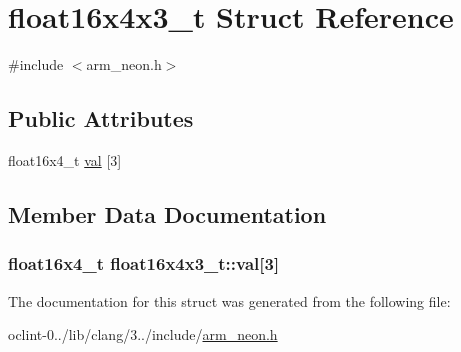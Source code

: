 \hypertarget{structfloat16x4x3__t}{\section{float16x4x3\-\_\-t Struct Reference}
\label{structfloat16x4x3__t}
}


{\ttfamily \#include $<$arm\-\_\-neon.\-h$>$}

\subsection*{Public Attributes}
\begin{DoxyCompactItemize}
\item 
float16x4\-\_\-t \hyperlink{structfloat16x4x3__t_a3cd43ea30e6c6079f4b135532a9c31b2}{val} \mbox{[}3\mbox{]}
\end{DoxyCompactItemize}


\subsection{Member Data Documentation}
\hypertarget{structfloat16x4x3__t_a3cd43ea30e6c6079f4b135532a9c31b2}{
\subsubsection[{val}]{\setlength{\rightskip}{0pt plus 5cm}float16x4\-\_\-t float16x4x3\-\_\-t\-::val\mbox{[}3\mbox{]}}}\label{structfloat16x4x3__t_a3cd43ea30e6c6079f4b135532a9c31b2}


The documentation for this struct was generated from the following file\-:\begin{DoxyCompactItemize}
\item 
oclint-\/0../lib/clang/3../include/\hyperlink{arm__neon_8h}{arm\-\_\-neon.\-h}\end{DoxyCompactItemize}
